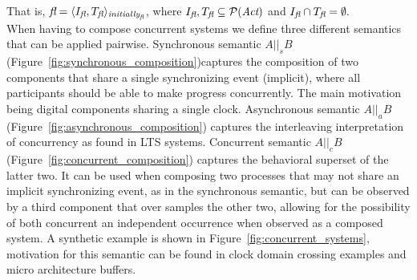 \documentclass{article}
\begin{document}
That is,
$ \emph{fl} = \langle I_{\emph{fl}}, T_{\emph{fl}} \rangle_{\emph{initially}_{\emph{fl}}} $, 
where 
$I_{\emph{fl}},T_{\emph{fl}} \subseteq \mathcal{P}(\emph{Act})$ 
and $I_{\emph{fl}} \cap T_{\emph{fl}} = \emptyset.$\\

When having to compose concurrent systems we define three different semantics that can be applied pairwise. Synchronous semantic $A ||_s B$ (Figure~\ref{fig:synchronous_composition})captures the composition of two components that share a single synchronizing event (implicit), where all participants should be able to make progress concurrently. The main motivation being digital components sharing a single clock. 
Asynchronous semantic $A ||_a B$ (Figure~\ref{fig:asynchronous_composition}) captures the interleaving interpretation of concurrency as found in LTS systems. Concurrent semantic $A ||_c B$ (Figure~\ref{fig:concurrent_composition}) captures the behavioral superset of the latter two. It can be used when composing two processes that may not share an implicit synchronizing event, as in the synchronous semantic, but can be observed by a third component that over samples the other two, allowing for the possibility of both concurrent an independent occurrence when observed as a composed system. A synthetic example is shown in Figure~\ref{fig:concurrent_systems}, motivation for this semantic can be found in clock domain crossing examples and micro architecture buffers.


\end{document}

